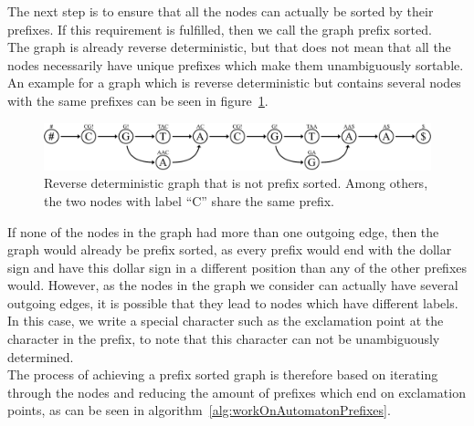 \documentclass[a4paper,12pt,twoside,BCOR=10mm]{scrbook}
\begin{document}
The next step is to ensure that all the nodes can actually be sorted by their prefixes. 
If this requirement is fulfilled, then we call the graph prefix sorted. \\
The graph is already reverse deterministic, but that does not mean that all the nodes 
necessarily have unique prefixes which make them unambiguously sortable. 
An example for a graph which is reverse deterministic but contains several nodes 
with the same prefixes can be seen in figure~\ref{fig:evo_gml_rev_det_but_not_prev_sort}. 
\begin{figure}[!htb]
\centering
\includegraphics[width=\textwidth]{evo_gml_rev_det_but_not_prev_sort.pdf}
\caption[Reverse deterministic graph that is not prefix sorted]{Reverse deterministic graph that is not prefix sorted. Among others, the two nodes with label \textup{“C”} share the same prefix.} \label{fig:evo_gml_rev_det_but_not_prev_sort}
\end{figure}
If none of the nodes in the graph had more than one outgoing edge, then the graph 
would already be prefix sorted, as every prefix would end with the dollar sign 
and have this dollar sign in a different position than any of the other prefixes would. 
However, as the nodes in the graph we consider can actually have several outgoing edges, 
it is possible that they lead to nodes which have different labels. In this case, 
we write a special character such as the exclamation point at the character in the prefix, 
to note that this character can not be unambiguously determined. \\
The process of achieving a prefix sorted graph is therefore based on iterating through 
the nodes and reducing the amount of 
prefixes which end on exclamation points, as can be seen in algorithm~\ref{alg:workOnAutomatonPrefixes}. 
\end{document}
